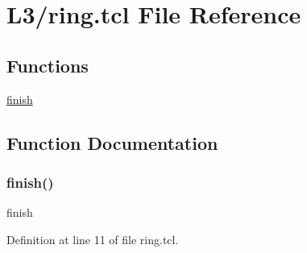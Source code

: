 \hypertarget{ring_8tcl}{}\section{L3/ring.tcl File Reference}
\label{ring_8tcl}
\subsection*{Functions}
\begin{DoxyCompactItemize}
\item 
\hyperlink{ring_8tcl_a30728837c246b65ef76298af0101d99c}{finish}
\end{DoxyCompactItemize}


\subsection{Function Documentation}
\mbox{\label{ring_8tcl_a30728837c246b65ef76298af0101d99c}} 
\subsubsection{\texorpdfstring{finish()}{finish()}}
{\footnotesize\ttfamily finish}



Definition at line 11 of file ring.\+tcl.

